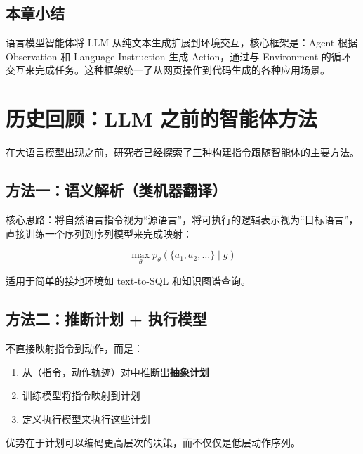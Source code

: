 \documentclass[a4paper]{article}
\begin{document}



\subsection{本章小结}

语言模型智能体将 LLM 从纯文本生成扩展到环境交互，核心框架是：Agent 根据 Observation 和 Language Instruction 生成 Action，通过与 Environment 的循环交互来完成任务。这种框架统一了从网页操作到代码生成的各种应用场景。


\section{历史回顾：LLM 之前的智能体方法}

在大语言模型出现之前，研究者已经探索了三种构建指令跟随智能体的主要方法。

\subsection{方法一：语义解析（类机器翻译）}




核心思路：将自然语言指令视为``源语言''，将可执行的逻辑表示视为``目标语言''，直接训练一个序列到序列模型来完成映射：

$$\max_\theta p_\theta(\{a_1, a_2, \ldots\} \mid g)$$

适用于简单的接地环境如 text-to-SQL 和知识图谱查询。

\subsection{方法二：推断计划 + 执行模型}

不直接映射指令到动作，而是：
\begin{enumerate}
    \item 从（指令，动作轨迹）对中推断出\textbf{抽象计划}
    \item 训练模型将指令映射到计划
    \item 定义执行模型来执行这些计划
\end{enumerate}

优势在于计划可以编码更高层次的决策，而不仅仅是低层动作序列。
\end{document}
